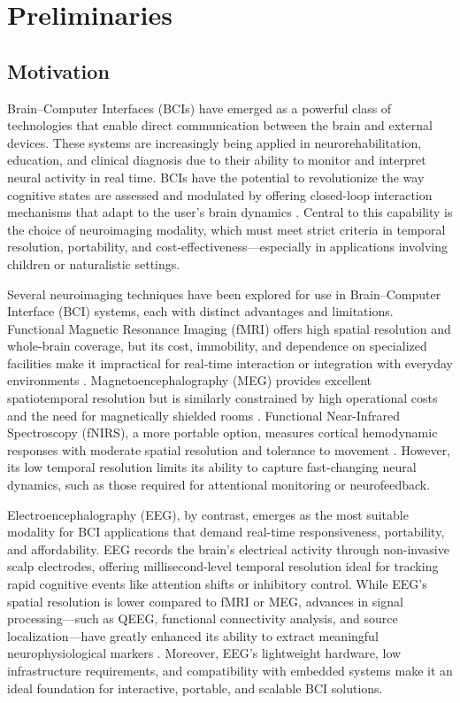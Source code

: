 


\chapter{Preliminaries}\label{sec:preliminaries}

\section{Motivation}\label{sec:motivation}

Brain–Computer Interfaces (BCIs) have emerged as a powerful class of technologies that enable direct communication between the brain and external devices. These systems are increasingly being applied in neurorehabilitation, education, and clinical diagnosis due to their ability to monitor and interpret neural activity in real time. BCIs have the potential to revolutionize the way cognitive states are assessed and modulated by offering closed-loop interaction mechanisms that adapt to the user’s brain dynamics \cite{Lim2023,Lin2025}. Central to this capability is the choice of neuroimaging modality, which must meet strict criteria in temporal resolution, portability, and cost-effectiveness—especially in applications involving children or naturalistic settings.

Several neuroimaging techniques have been explored for use in Brain–Computer Interface (BCI) systems, each with distinct advantages and limitations. Functional Magnetic Resonance Imaging (fMRI) offers high spatial resolution and whole-brain coverage, but its cost, immobility, and dependence on specialized facilities make it impractical for real-time interaction or integration with everyday environments \cite{Yang2025}. Magnetoencephalography (MEG) provides excellent spatiotemporal resolution but is similarly constrained by high operational costs and the need for magnetically shielded rooms \cite{Peksa2023}. Functional Near-Infrared Spectroscopy (fNIRS), a more portable option, measures cortical hemodynamic responses with moderate spatial resolution and tolerance to movement \cite{Doherty2023}. However, its low temporal resolution limits its ability to capture fast-changing neural dynamics, such as those required for attentional monitoring or neurofeedback.

Electroencephalography (EEG), by contrast, emerges as the most suitable modality for BCI applications that demand real-time responsiveness, portability, and affordability. EEG records the brain's electrical activity through non-invasive scalp electrodes, offering millisecond-level temporal resolution ideal for tracking rapid cognitive events like attention shifts or inhibitory control. While EEG's spatial resolution is lower compared to fMRI or MEG, advances in signal processing—such as QEEG, functional connectivity analysis, and source localization—have greatly enhanced its ability to extract meaningful neurophysiological markers \cite{Caiado2025,Yadav2023, Varbu2022}. Moreover, EEG's lightweight hardware, low infrastructure requirements, and compatibility with embedded systems make it an ideal foundation for interactive, portable, and scalable BCI solutions.

